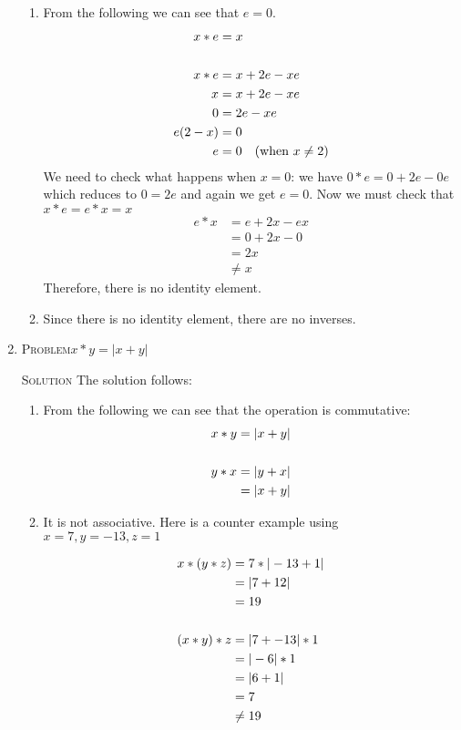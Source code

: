 \documentclass{amsart}
\newcommand{\Solution}{\textsc{Solution}\xspace}
\newcommand{\Problem}{\textsc{Problem}\xspace}
\begin{document}
\begin{enumerate}
\begin{enumerate}
      \item From the following we can see that $e=0$. 
      \begin{align*}
         x * e & = x                  \\
	 \\
	 x * e & = x + 2e - xe        \\
	     x & = x + 2e - xe \notag \\
	     0 & =     2e - xe \notag \\
	e(2-x) & = 0           \notag \\
	     e & = 0 \quad\text{(when $x \ne 2$)} \notag 
      \end{align*}
      We need to check what happens when $x = 0$: we have 
      $0*e=0+2e-0e$ which reduces to $0 = 2e$ and again we get $e = 0$.
      Now we must check that $x*e=e*x=x$
      \begin{align*}
         e * x & = e + 2x - ex      \\
	       & = 0 + 2x - 0       \\
	       & = 2x               \\
	       & \ne x              
      \end{align*}
      Therefore, there is no identity element.

      \item Since there is no identity element, there are no inverses.

   \end{enumerate}

   \item \Problem $x * y = | x + y |$

   \noindent \Solution The solution follows:

   \begin{enumerate}
      \item From the following we can see that the operation is commutative:
      \begin{align*}
         x * y & = | x + y |         \\
	 \\
	 y * x & = | y + x |         \\
	       & = | x + y | \notag  
      \end{align*}

      \item It is not associative. Here is a counter example using
      $x = 7, y = -13, z = 1$

      \begin{align*}
         x * (y * z) & = 7 * | -13 + 1 | \\
	             & = | 7 + 12 | \notag \\
		     & = 19         \notag \\
		                    \notag \\
	 (x * y) * z & = | 7 + -13 | * 1   \\
	             & = | -6 | * 1 \notag \\
		     & = | 6 + 1 |  \notag \\
		     & = 7          \notag \\
		     & \ne 19       \notag
      \end{align*}


\end{enumerate}
\end{enumerate}
\end{document}
